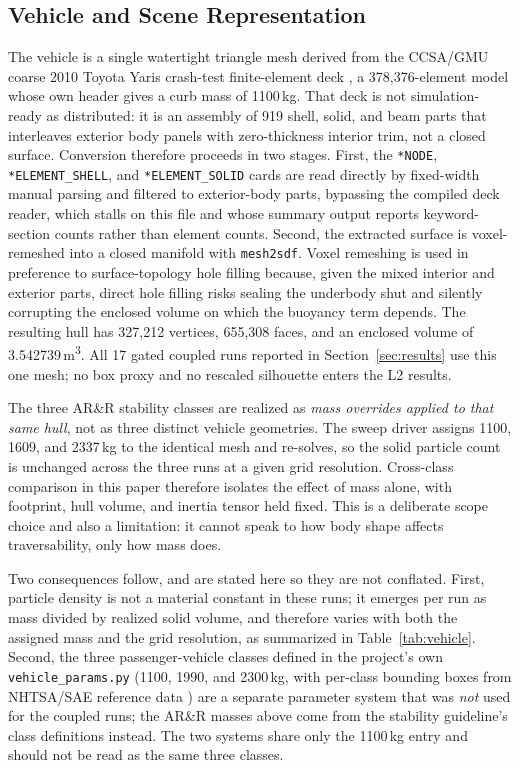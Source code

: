 \documentclass[conference]{IEEEtran}
\begin{document}
\subsection{Vehicle and Scene Representation}
The vehicle is a single watertight triangle mesh derived from the CCSA/GMU coarse 2010 Toyota Yaris crash-test finite-element deck \cite{ccsa2010yaris}, a 378{,}376-element model whose own header gives a curb mass of 1100\,kg. That deck is not simulation-ready as distributed: it is an assembly of 919 shell, solid, and beam parts that interleaves exterior body panels with zero-thickness interior trim, not a closed surface. Conversion therefore proceeds in two stages. First, the \texttt{*NODE}, \texttt{*ELEMENT\_SHELL}, and \texttt{*ELEMENT\_SOLID} cards are read directly by fixed-width manual parsing and filtered to exterior-body parts, bypassing the compiled deck reader, which stalls on this file and whose summary output reports keyword-section counts rather than element counts. Second, the extracted surface is voxel-remeshed into a closed manifold with \texttt{mesh2sdf}. Voxel remeshing is used in preference to surface-topology hole filling because, given the mixed interior and exterior parts, direct hole filling risks sealing the underbody shut and silently corrupting the enclosed volume on which the buoyancy term depends. The resulting hull has 327{,}212 vertices, 655{,}308 faces, and an enclosed volume of 3.542739\,m\textsuperscript{3}. All 17 gated coupled runs reported in Section~\ref{sec:results} use this one mesh; no box proxy and no rescaled silhouette enters the L2 results.

The three AR\&R stability classes are realized as \emph{mass overrides applied to that same hull}, not as three distinct vehicle geometries. The sweep driver assigns 1100, 1609, and 2337\,kg to the identical mesh and re-solves, so the solid particle count is unchanged across the three runs at a given grid resolution. Cross-class comparison in this paper therefore isolates the effect of mass alone, with footprint, hull volume, and inertia tensor held fixed. This is a deliberate scope choice and also a limitation: it cannot speak to how body shape affects traversability, only how mass does.

Two consequences follow, and are stated here so they are not conflated. First, particle density is not a material constant in these runs; it emerges per run as mass divided by realized solid volume, and therefore varies with both the assigned mass and the grid resolution, as summarized in Table~\ref{tab:vehicle}. Second, the three passenger-vehicle classes defined in the project's own \texttt{vehicle\_params.py} (1100, 1990, and 2300\,kg, with per-class bounding boxes from NHTSA/SAE reference data \cite{sae1999011336}) are a separate parameter system that was \emph{not} used for the coupled runs; the AR\&R masses above come from the stability guideline's class definitions instead. The two systems share only the 1100\,kg entry and should not be read as the same three classes.
\end{document}
